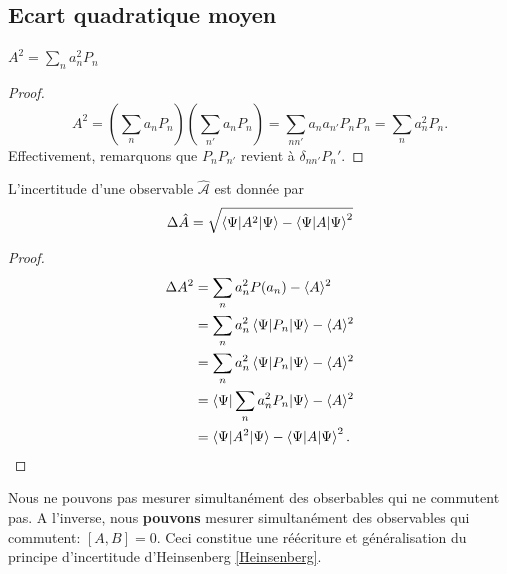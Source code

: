 \documentclass[../notesdecours.tex]{subfiles}
\begin{document}
\subsection{Ecart quadratique moyen}
\begin{lemma}
$A^2 = \sum_n a_n^2P_n$
\end{lemma}
\begin{proof}
\begin{equation*}
A^2 = (\sum_n a_nP_n)(\sum_{n'} a_nP_n) = \sum_{nn'} a_na_{n'}P_nP_{n} = \sum_n a_n^2P_n.
\end{equation*}
Effectivement, remarquons que $P_nP_{n'}$ revient à $\delta_{nn'}P_n'$.
\end{proof}

\begin{Property}
	L'incertitude d'une observable $\mathcal{\hat{A}}$ est donnée par
	\begin{equation}
		\Delta \hat{A} = \sqrt{\braket{\Psi|A^2|\Psi} - \braket{\Psi|A|\Psi}^2}
	\end{equation}
\end{Property}
\begin{proof}
	\begin{align*}
		\Delta A^2 &= \sum_n a_n^2 P(a_n) - \langle A\rangle^2\\
		&= \sum_n a_n^2 \braket{\Psi|P_n|\Psi} - \langle A\rangle^2\\
		&= \sum_n a_n^2 \braket{\Psi|P_n|\Psi} - \langle A\rangle^2\\
		&= \braket{\Psi|\sum_n a_n^2 P_n|\Psi} - \langle A\rangle^2\\
		&= \braket{\Psi|A^2|\Psi} - \braket{\Psi|A|\Psi}^2.
		\end{align*}	
\end{proof}

\begin{remark} Nous ne pouvons pas mesurer simultanément des obserbables qui ne commutent pas. A l'inverse, nous \textbf{pouvons} mesurer simultanément des observables qui commutent: $[A,B] = 0$. Ceci constitue une réécriture et généralisation du principe d'incertitude d'Heinsenberg \eqref{Heinsenberg}.\end{remark}

\begin{center}
\end{center}
\end{document}
